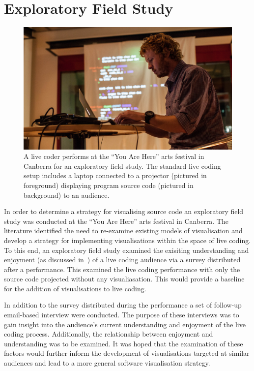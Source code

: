 
\chapter{Exploratory Field Study}
\label{chap:exploratory-field-study}

\begin{figure}
\centering
\includegraphics[width=1.0\textwidth]{../images/study-1-you-are-here-ben.jpg}
\caption{A live coder performs at the ``You Are Here'' arts festival in Canberra for an exploratory field study. The standard live coding setup includes a laptop connected to a projector (pictured in foreground) displaying program source code (pictured in background) to an audience.}
\label{fig:exploratory-field-study-ben}
\end{figure}


In order to determine a strategy for visualising source code an exploratory field study was conducted at the ``You Are Here'' arts festival in Canberra. The literature identified the need to re-examine existing models of visualisation and develop a strategy for implementing visualisations within the space of live coding. To this end, an exploratory field study examined the exisiting understanding and enjoyment (as discussed in~\cite{McLean2010a}) of a live coding audience via a survey distributed after a performance. This examined the live coding performance with only the source code projected without any visualiasation. This would provide a baseline for the addition of visualisations to live coding.

In addition to the survey distributed during the performance a set of follow-up email-based interview were conducted. The purpose of these interviews was to gain insight into the audience's current understanding and enjoyment of the live coding process. Additionally, the relationship between enjoyment and understanding was to be examined. It was hoped that the examination of these factors would further inform the development of visualisations targeted at similar audiences and lead to a more general software visualisation strategy.

